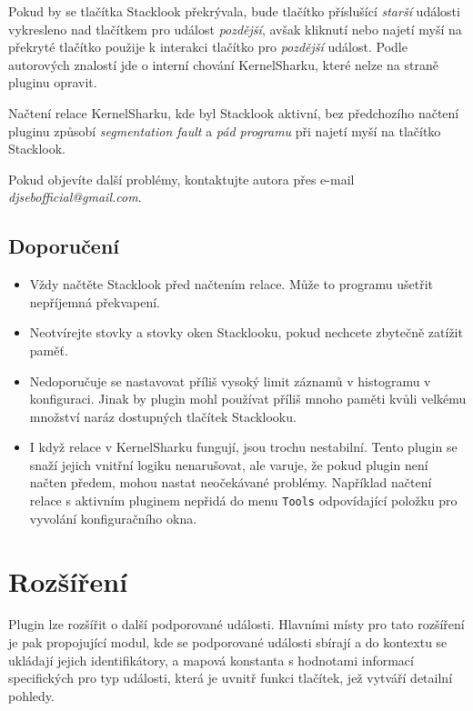 Pokud by se tlačítka Stacklook překrývala, bude tlačítko příslušící \emph{starší} události vykresleno nad tlačítkem pro událost \emph{pozdější}, avšak kliknutí nebo najetí myší na překryté tlačítko použije k interakci tlačítko pro \emph{pozdější} událost. Podle autorových znalostí jde o interní chování KernelSharku, které nelze na straně pluginu opravit.

Načtení relace KernelSharku, kde byl Stacklook aktivní, bez předchozího načtení pluginu způsobí \emph{segmentation fault} a \emph{pád programu} při najetí myší na tlačítko Stacklook.

Pokud objevíte další problémy, kontaktujte autora přes e-mail \emph{djsebofficial@gmail.com}.

\subsection{Doporučení}

\begin{itemize}
  \item Vždy načtěte Stacklook před načtením relace. Může to programu ušetřit nepříjemná překvapení.
  \item Neotvírejte stovky a stovky oken Stacklooku, pokud nechcete zbytečně zatížit paměť.
  \item Nedoporučuje se nastavovat příliš vysoký limit záznamů v histogramu v konfiguraci. Jinak by plugin mohl používat příliš mnoho paměti kvůli velkému množství naráz dostupných tlačítek Stacklooku.
  \item I když relace v KernelSharku fungují, jsou trochu nestabilní. Tento plugin se snaží jejich vnitřní logiku nenarušovat, ale varuje, že pokud plugin není načten předem, mohou nastat neočekávané problémy. Například načtení relace s aktivním pluginem nepřidá do menu \texttt{Tools} odpovídající položku pro vyvolání konfiguračního okna.
\end{itemize}

\section{Rozšíření}

Plugin lze rozšířit o další podporované události. Hlavními místy pro tato rozšíření je pak propojující modul, kde se podporované události sbírají a do kontextu se ukládají jejich identifikátory, a mapová konstanta s hodnotami informací specifických pro typ události, která je uvnitř funkci tlačítek, jež vytváří detailní pohledy.